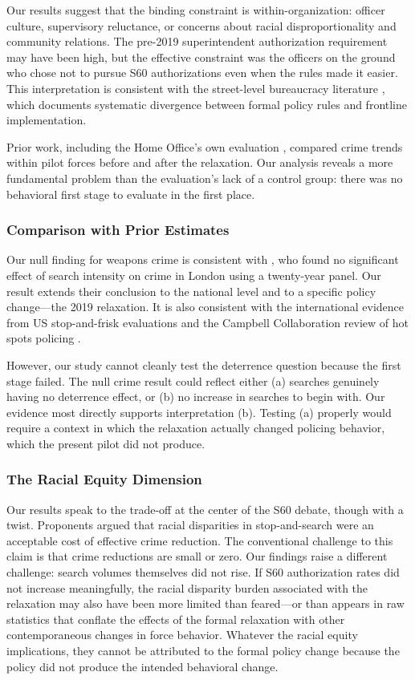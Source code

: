 \documentclass[12pt]{article}
\begin{document}
Our results suggest that the binding constraint is within-organization: officer culture, supervisory reluctance, or concerns about racial disproportionality and community relations. The pre-2019 superintendent authorization requirement may have been high, but the effective constraint was the officers on the ground who chose not to pursue S60 authorizations even when the rules made it easier. This interpretation is consistent with the street-level bureaucracy literature \citep{lipsky1980}, which documents systematic divergence between formal policy rules and frontline implementation.

Prior work, including the Home Office's own evaluation \citep{homeoffice2020pilot}, compared crime trends within pilot forces before and after the relaxation. Our analysis reveals a more fundamental problem than the evaluation's lack of a control group: there was no behavioral first stage to evaluate in the first place.

\subsubsection*{Comparison with Prior Estimates}

Our null finding for weapons crime is consistent with \citet{tiratelli2018}, who found no significant effect of search intensity on crime in London using a twenty-year panel. Our result extends their conclusion to the national level and to a specific policy change---the 2019 relaxation. It is also consistent with the international evidence from US stop-and-frisk evaluations \citep{macdonald2016} and the Campbell Collaboration review of hot spots policing \citep{braga2019}.

However, our study cannot cleanly test the deterrence question because the first stage failed. The null crime result could reflect either (a) searches genuinely having no deterrence effect, or (b) no increase in searches to begin with. Our evidence most directly supports interpretation (b). Testing (a) properly would require a context in which the relaxation actually changed policing behavior, which the present pilot did not produce.

\subsubsection*{The Racial Equity Dimension}

Our results speak to the trade-off at the center of the S60 debate, though with a twist. Proponents argued that racial disparities in stop-and-search were an acceptable cost of effective crime reduction. The conventional challenge to this claim is that crime reductions are small or zero. Our findings raise a different challenge: search volumes themselves did not rise. If S60 authorization rates did not increase meaningfully, the racial disparity burden associated with the relaxation may also have been more limited than feared---or than appears in raw statistics that conflate the effects of the formal relaxation with other contemporaneous changes in force behavior. Whatever the racial equity implications, they cannot be attributed to the formal policy change because the policy did not produce the intended behavioral change.
\end{document}
